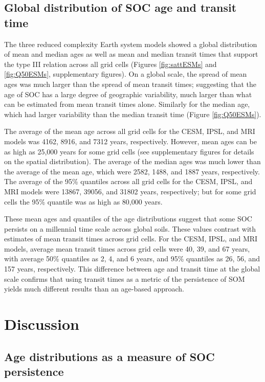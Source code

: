 \documentclass[draft,linenumbers]{agujournal}
\begin{document}
\subsection{Global distribution of SOC age and transit time}
The three reduced complexity Earth system models showed a global distribution of mean and median ages as well as mean and median transit times that support the type III relation across all grid cells (Figures \ref{fig:sattESMs} and \ref{fig:Q50ESMs}, supplementary figures). On a global scale, the spread of mean ages was much larger than the spread of mean transit times; suggesting that the age of SOC has a large degree of geographic variability, much larger than what can be estimated from mean transit times alone. Similarly for the median age, which had larger variability than the median transit time (Figure \ref{fig:Q50ESMs}).

The average of the mean age across all grid cells for the CESM, IPSL, and MRI models was 4162, 8916, and 7312 years, respectively. However, mean ages can be as high as 25,000 years for some grid cells (see supplementary figures for details on the spatial distribution). The average of the median ages was much lower than the average of the mean age, which were 2582, 1488, and 1887 years, respectively. 
The average of the 95\% quantiles across all grid cells for the CESM, IPSL, and MRI models were 13867, 39056, and 31802 years, respectively; but for some grid cells the 95\% quantile was as high as 80,000 years. 

These mean ages and quantiles of the age distributions suggest that some SOC persists on a millennial time scale across global soils. These values contrast with estimates of mean transit times across grid cells. For the CESM, IPSL, and MRI models, average mean transit times across grid cells were 40, 39, and 67 years, with average 
50\% quantiles as 2, 4, and 6 years, and 
95\% quantiles as 26,  56, and 157 years, respectively. This difference between age and transit time at the global scale confirms that using transit times as a metric of the persistence of SOM yields much different results than an age-based approach.


\section{Discussion}
\subsection{Age distributions as a measure of SOC persistence}
\end{document}
